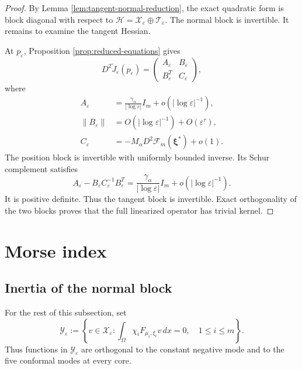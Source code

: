 \documentclass[11pt]{article}
\numberwithin{equation}{section}
\begin{document}
\begin{proof}
By Lemma \ref{lem:tangent-normal-reduction}, the exact quadratic form
is block diagonal with respect to
$\mathcal H=\mathcal X_\varepsilon\oplus\mathcal T_\varepsilon$.
The normal block is invertible. It remains to examine the tangent
Hessian.

At $p_\varepsilon$, Proposition \ref{prop:reduced-equations} gives
\begin{equation*}
D^2\widetilde J_\varepsilon(p_\varepsilon)
=\begin{pmatrix}
A_\varepsilon&B_\varepsilon\\
B_\varepsilon^T&C_\varepsilon
\end{pmatrix},
\end{equation*}
where
\begin{equation*}
\begin{aligned}
A_\varepsilon
&=\frac{\gamma_\alpha}{|\log\varepsilon|}I_m
+o(|\log\varepsilon|^{-1}),\\
\|B_\varepsilon\|
&=O(|\log\varepsilon|^{-1})+O(\varepsilon^\tau),\\
C_\varepsilon
&=-M_\alpha D^2\mathcal F_m(\boldsymbol\xi^*)+o(1).
\end{aligned}
\end{equation*}
The position block is invertible with uniformly bounded inverse. Its
Schur complement satisfies
\begin{equation*}
A_\varepsilon-B_\varepsilon C_\varepsilon^{-1}B_\varepsilon^T
=
\frac{\gamma_\alpha}{|\log\varepsilon|}I_m
+o(|\log\varepsilon|^{-1}).
\end{equation*}
It is positive definite. Thus the tangent block is invertible. Exact
orthogonality of the two blocks proves that the full linearized
operator has trivial kernel.
\end{proof}

\section{Morse index}

\subsection{Inertia of the normal block}


For the rest of this subsection, set
\begin{equation}\label{eq:positive-normal-subspace}
\mathcal Y_\varepsilon
:=\left\{
v\in\mathcal X_\varepsilon:
\int_\Omega\chi_iF_{\mu_i,\xi_i}v\,dx=0,
\quad 1\leq i\leq m
\right\}.
\end{equation}
Thus functions in $\mathcal Y_\varepsilon$ are orthogonal to the
constant negative mode and to the five conformal modes at every core.
\end{document}
